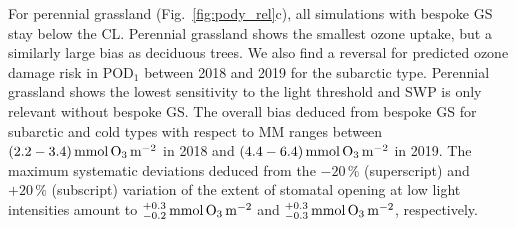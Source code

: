 \documentclass[bg, manuscript]{copernicus}
\begin{document}
For perennial grassland (Fig.~\ref{fig:pody_rel}c), all simulations with bespoke GS stay below the CL. Perennial grassland shows the smallest ozone uptake, but a similarly large bias as deciduous trees. We also find a reversal for predicted ozone damage risk in $\mathrm{POD_1}$ between 2018 and 2019 for the subarctic type. Perennial grassland shows the lowest sensitivity to the light threshold and SWP is only relevant without bespoke GS. The overall bias deduced from bespoke GS for subarctic and cold types with respect to MM ranges between $(2.2-3.4)\,\unit{mmol\,\chem{O_3}\,m^{-2}}$ in 2018 and $(4.4-6.4)\,\unit{mmol\,\chem{O_3}\,m^{-2}}$ in 2019. The maximum systematic deviations deduced from the $-20\,\unit{\%}$ (superscript) and $+20\,\unit{\%}$ (subscript) variation of the extent of stomatal opening at low light intensities amount to $^{+0.3}_{-0.2}\,\unit{mmol\,\chem{O_3}\,m^{-2}}$ and $^{+0.3}_{-0.3}\,\unit{mmol\,\chem{O_3}\,m^{-2}}$, respectively.
\end{document}
